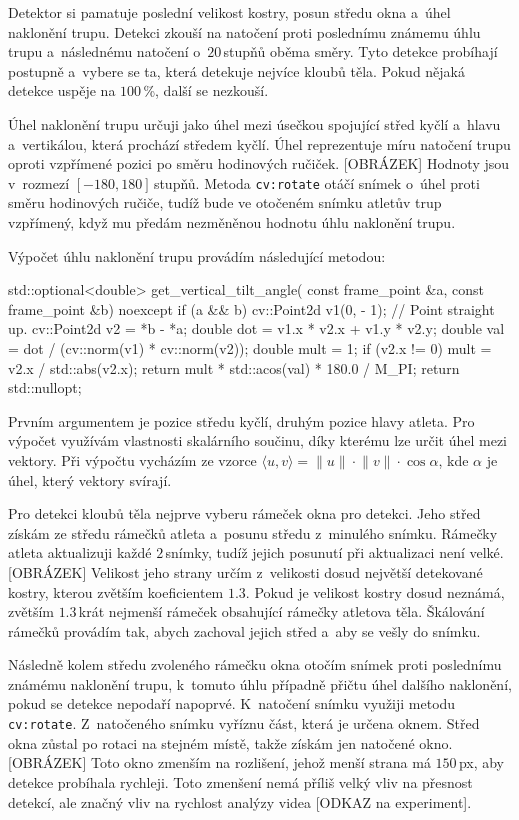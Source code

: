 Detektor si pamatuje poslední velikost kostry, posun středu okna a~úhel naklonění trupu. Detekci zkouší na natočení proti poslednímu známemu úhlu trupu a~následnému natočení o~$20$\,\rm stupňů oběma směry. Tyto detekce probíhají postupně a~vybere se ta, která detekuje nejvíce kloubů těla. Pokud nějaká detekce uspěje na $100$\,\rm \%, další se nezkouší.

Úhel naklonění trupu určuji jako úhel mezi úsečkou spojující střed kyčlí a~hlavu a~vertikálou, která prochází středem kyčlí. Úhel reprezentuje míru natočení trupu oproti vzpřímené pozici po směru hodinových ručiček. [OBRÁZEK] Hodnoty jsou v~rozmezí $[-180,180]$\,\rm stupňů. Metoda \texttt{cv\::rotate} otáčí snímek o~úhel proti směru hodinových ručiče, tudíž bude ve otočeném snímku atletův trup vzpřímený, když mu předám nezměněnou hodnotu úhlu naklonění trupu.

Výpočet úhlu naklonění trupu provádím následující metodou:
\begin{code}[fontsize=\footnotesize]
std::optional<double> get_vertical_tilt_angle(
    const frame_point &a,
    const frame_point &b) noexcept {
        if (a && b) {
            cv::Point2d v1(0, - 1); // Point straight up.
            cv::Point2d v2 = *b - *a;
            double dot = v1.x * v2.x + v1.y * v2.y;
            double val = dot / (cv::norm(v1) * cv::norm(v2));
            double mult = 1;
            if (v2.x != 0)
                mult = v2.x / std::abs(v2.x);
            return mult * std::acos(val) * 180.0 / M_PI;
        }
        return std::nullopt;
}
\end{code}
Prvním argumentem je pozice středu kyčlí, druhým pozice hlavy atleta. Pro výpočet využívám vlastnosti skalárního součinu, díky kterému lze určit úhel mezi vektory. Při výpočtu vycházím ze vzorce $\langle u,v\rangle=\lVert u\rVert\cdot\lVert v\rVert\cdot\cos\alpha$, kde $\alpha$ je úhel, který vektory svírají.

Pro detekci kloubů těla nejprve vyberu rámeček okna pro detekci. Jeho střed získám ze středu rámečků atleta a~posunu středu z~minulého snímku. Rámečky atleta aktualizuji každé $2$\,\rm snímky, tudíž jejich posunutí při aktualizaci není velké. [OBRÁZEK] Velikost jeho strany určím z~velikosti dosud největší detekované kostry, kterou zvětším koeficientem $1.3$. Pokud je velikost kostry dosud neznámá, zvětším $1.3$\,\rm krát nejmenší rámeček obsahující rámečky atletova těla. Škálování rámečků provádím tak, abych zachoval jejich střed a~aby se vešly do snímku.

Následně kolem středu zvoleného rámečku okna otočím snímek proti poslednímu známému naklonění trupu, k~tomuto úhlu případně přičtu úhel dalšího naklonění, pokud se detekce nepodaří napoprvé. K~natočení snímku využiji metodu \texttt{cv\::rotate}. Z~natočeného snímku vyříznu část, která je určena oknem. Střed okna zůstal po rotaci na stejném místě, takže získám jen natočené okno. [OBRÁZEK] Toto okno zmenším na rozlišení, jehož menší strana má $150$\,\rm px, aby detekce probíhala rychleji. Toto zmenšení nemá příliš velký vliv na přesnost detekcí, ale značný vliv na rychlost analýzy videa [ODKAZ na experiment].

